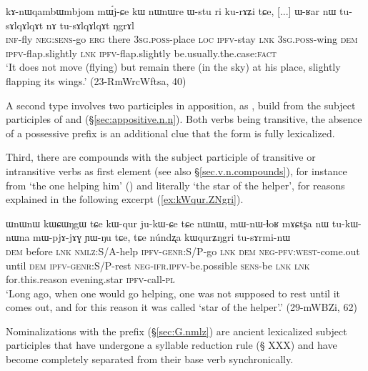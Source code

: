 \begin{exe}
\ex \label{ex:kAnWqambWmbjom.mWjCe}
 \gll  kɤ-nɯqambɯmbjom mɯ́j-ɕe kɯ nɯnɯre ɯ-stu ri ku-rɤʑi tɕe, [...] ɯ-ʁar nɯ tu-sɤlqɤlqɤt nɤ tu-sɤlqɤlqɤt ŋgrɤl  \\
 \textsc{inf}-fly \textsc{neg}:\textsc{sens}-go \textsc{erg} there \textsc{3sg}.\textsc{poss}-place \textsc{loc} \textsc{ipfv}-stay \textsc{lnk} { } \textsc{3sg}.\textsc{poss}-wing \textsc{dem} \textsc{ipfv}-flap.slightly \textsc{lnk}  \textsc{ipfv}-flap.slightly be.usually.the.case:\textsc{fact} \\
 \glt `It does not move (flying) but remain there (in the sky) at his place, slightly flapping its wings.' (23-RmWrcWftsa, 40)
\end{exe}

A second type involves two participles in apposition, as , build from the subject participles of  and   (§\ref{sec:appositive.n.n}). Both verbs being transitive, the absence of a possessive prefix  is an additional clue that the form is fully lexicalized.

Third, there are compounds with the subject participle of transitive or intransitive verbs as first element (see also §\ref{sec.v.n.compounds}), for instance  from  `the one helping him' () and  literally `the star of the helper', for reasons explained in the following excerpt (\ref{ex:kWqur.ZNgri}).

\begin{exe}
\ex \label{ex:kWqur.ZNgri}
\gll ɯnɯnɯ kɯɕɯŋgɯ tɕe kɯ-qur ju-kɯ-ɕe tɕe nɯnɯ, mɯ-nɯ-ɬoʁ mɤɕtʂa nɯ tu-kɯ-nɯna mɯ-pjɤ-jɤɣ ɲɯ-ŋu tɕe,  tɕe núndʐa kɯqurʑŋgri tu-sɤrmi-nɯ \\
\textsc{dem} before \textsc{lnk} \textsc{nmlz}:S/A-help \textsc{ipfv}-\textsc{genr}:S/P-go \textsc{lnk} \textsc{dem} \textsc{neg}-\textsc{pfv}:\textsc{west}-come.out until \textsc{dem} \textsc{ipfv}-\textsc{genr}:S/P-rest \textsc{neg}-\textsc{ifr}.\textsc{ipfv}-be.possible \textsc{sens}-be \textsc{lnk} \textsc{lnk} for.this.reason evening.star \textsc{ipfv}-call-\textsc{pl} \\
\glt `Long ago, when one would go helping, one was not supposed to rest until it comes out, and for this reason it was called `star of the helper'.' (29-mWBZi, 62)
\end{exe}


Nominalizations with the  prefix (§\ref{sec:G.nmlz}) are ancient lexicalized subject participles that have undergone a syllable reduction rule (§ XXX) and have become completely separated from their base verb synchronically.


